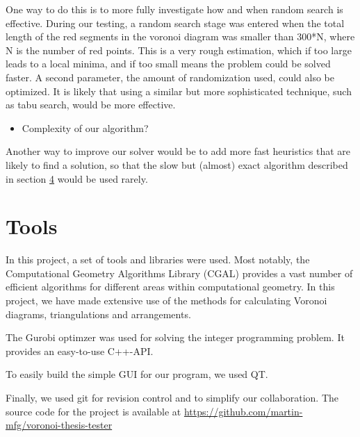 \documentclass[a4paper,12pt]{article}
\begin{document}
One way to do this is to more fully investigate how and when random search is effective. During our testing, a random search stage was entered when the total length of the red segments in the voronoi diagram was smaller than 300*N, where N is the number of red points. This is a very rough estimation, which if too large leads to a local minima, and if too small means the problem could be solved faster. A second parameter, the amount of randomization used, could also be optimized. It is likely that using a similar but more sophisticated technique, such as tabu search, would be more effective.


\begin{itemize}
\item
Complexity of our algorithm? 
\end{itemize}

Another way to improve our solver would be to add more fast heuristics that are likely to find a solution, so that the slow but (almost) exact algorithm described in section \hyperref[sec:findPoints]{4} would be used rarely.

\section{Tools}
In this project, a set of tools and libraries were used. Most notably, the Computational Geometry Algorithms Library (CGAL) provides a vast number of efficient algorithms for different areas within computational geometry. In this project, we have made extensive use of the methods for calculating Voronoi diagrams, triangulations and arrangements.

The Gurobi optimzer was used for solving the integer programming problem. It provides an easy-to-use C++-API.

To easily build the simple GUI for our program, we used QT.

Finally, we used git for revision control and to simplify our collaboration. The source code for the project is available at \url{https://github.com/martin-mfg/voronoi-thesis-tester}
\end{document}
